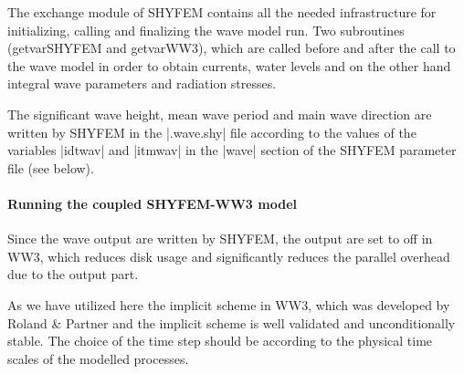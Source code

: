 The exchange module of SHYFEM contains all the needed infrastructure
for initializing, calling and finalizing the wave model run. Two
subroutines (getvarSHYFEM and getvarWW3), which are called before and
after the call to the wave model in order to obtain currents, water
levels and on the other hand integral wave parameters and radiation
stresses.

The significant wave height, mean wave period and main wave 
direction are written by SHYFEM in the |.wave.shy| file according
to the values of the variables |idtwav| and |itmwav| in the |wave|
section of the SHYFEM parameter file (see below).

\paragraph{Running the coupled SHYFEM-WW3 model}
Since the wave output are written by SHYFEM, the output are
set to off in WW3, which reduces disk usage and significantly reduces 
the parallel overhead due to the output part. 

As we have utilized here the implicit scheme in WW3, which was
developed by Roland \& Partner and the implicit scheme is well
validated and unconditionally stable. The choice of the time step
should be according to the physical time scales of the modelled
processes. 

